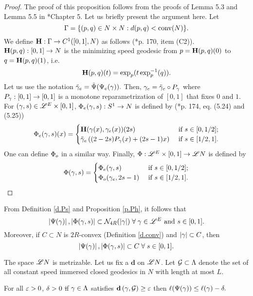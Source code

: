 \documentclass[11pt,twoside]{article}
\begin{document}
\begin{proof}
	The proof of this proposition follows from the proofs of Lemma 5.3 and Lemma 5.5 in \cite{CM_book}*{Chapter 5}. Let us briefly present the argument here. Let
	\[\Gamma=\{(p,q)\in N\times N: d(p,q)<\text{conv}(N)\}.\]
	We define \(\mathbf{H}:\Gamma \rightarrow C^1([0,1],N)\) as follows (\cite{CM_book}*{p. 170, item (C2)}). \(\mathbf{H}(p,q):[0,1]\rightarrow N\) is the minimizing \cn speed geodesic from $p=\mathbf{H}(p,q)(0)$ to \(q=\mathbf{H}(p,q)(1)\), i.e. 
\begin{equation}\label{e.bH}
\mathbf{H}(p,q)(t)= \exp_p(t\exp_p^{-1}(q)).
\end{equation}	
 Let us use the notation \(\tilde{\gamma}_{e}=\tilde{\Psi}(\Psi_e(\gamma)).\) Then, \(\gamma_e=\tilde{\gamma}_e\circ P_{\gamma}\) where \(P_{\gamma}:[0,1]\rightarrow [0,1]\) is a monotone reparametrization of \([0,1]\) that fixes \(0\) and \(1\). For $(\gamma , s)\in \mathscr{L}^E\times [0,1]$, \(\Phi_e(\gamma,s):S^1\rightarrow N\) is defined by (\cite{CM_book}*{p. 174, eq. (5.24) and (5.25)})
\begin{equation*}
\Phi_e(\gamma, s)(x)=
\begin{cases}
\mathbf{H}(\gamma(x),\gamma_e(x))(2s) &\text{ if } s\in [0,1/2];\\
\tilde{\gamma}_e\left((2-2s)P_{\gamma}(x)+(2s-1)x\right) &\text{ if } s\in [1/2,1].
\end{cases}
\end{equation*}
One can define \(\Phi_o\) in a similar way. Finally, \(\Phi:\mathscr{L}^E\times[0,1]\rightarrow \mathscr{L} N\) is defined by 
\begin{equation*}
\Phi(\gamma, s)=
\begin{cases}
\Phi_e(\gamma , s) &\text{ if } s\in [0,1/2];\\
\Phi_o(\gamma_e, 2s-1) &\text{ if } s\in [1/2,1].
\end{cases}
\end{equation*}
\end{proof}

\begin{rmk}\label{r.spt.Ps.Ph}
From Definition \ref{d.Ps} and Proposition \ref{p.Ph}, it follows that
\[\left|\Psi(\gamma)\right|,\left|\Phi(\gamma,s)\right| \subset \mathcal{N}_{4R}(\left|\gamma\right|)\; \forall\;\gamma\in\mathscr{L}^E \text{ and }s\in [0,1].\]
Moreover, if \(C\subset N\) is $2R$-convex (Definition \ref{d.conv}) and \(\left|\gamma\right|\subset C\), then
\[\left|\Psi(\gamma)\right|,\left|\Phi(\gamma,s)\right| \subset C\; \forall\;s\in [0,1].\]
\end{rmk}

The space $\mathscr{L} N$ is metrizable. Let us fix a \mt \(\mathbf{d}\) on $\mathscr{L} N$.  Let \(\mathcal{G} \subset \Lambda\) denote the set of all constant speed immersed closed geodesics in \(N\) with length at most \(L\). 
\begin{pro}\label{p.len.Ps.ga}
	For all \(\varepsilon>0\), \tes \(\delta>0\) \st if \(\gamma\in \Lambda\) satisfies \(\mathbf{d}\left(\gamma,\mathcal{G}\right)\geq \varepsilon\) then \(\ell(\Psi(\gamma))\leq \ell(\gamma)-\delta.\)
\end{pro}
\end{document}
